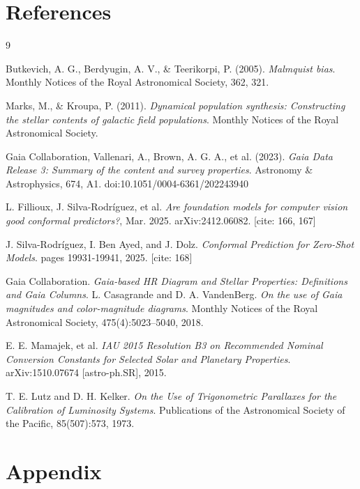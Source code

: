 \documentclass[11pt]{article}
\begin{document}
\section{References}
\begin{thebibliography}{9}

Butkevich, A. G., Berdyugin, A. V., \& Teerikorpi, P. (2005).
\textit{Malmquist bias}.
Monthly Notices of the Royal Astronomical Society, 362, 321.

Marks, M., \& Kroupa, P. (2011).
\textit{Dynamical population synthesis: Constructing the stellar contents of galactic field populations}.
Monthly Notices of the Royal Astronomical Society.

Gaia Collaboration, Vallenari, A., Brown, A. G. A., et al. (2023).
\textit{Gaia Data Release 3: Summary of the content and survey properties}.
Astronomy \& Astrophysics, 674, A1.
doi:10.1051/0004-6361/202243940

L. Fillioux, J. Silva-Rodríguez, et al. 
\textit{Are foundation models for computer vision good conformal predictors?}, 
Mar. 2025. arXiv:2412.06082. [cite: 166, 167]

J. Silva-Rodríguez, I. Ben Ayed, and J. Dolz. 
\textit{Conformal Prediction for Zero-Shot Models}. 
pages 19931-19941, 2025. [cite: 168]

Gaia Collaboration. 
\textit{Gaia-based HR Diagram and Stellar Properties: Definitions and Gaia Columns}. 
L. Casagrande and D. A. VandenBerg. 
\textit{On the use of Gaia magnitudes and color-magnitude diagrams}. 
Monthly Notices of the Royal Astronomical Society, 475(4):5023–5040, 2018.

E. E. Mamajek, et al. 
\textit{IAU 2015 Resolution B3 on Recommended Nominal Conversion Constants for Selected Solar and Planetary Properties}. 
arXiv:1510.07674 [astro-ph.SR], 2015.

T. E. Lutz and D. H. Kelker. 
\textit{On the Use of Trigonometric Parallaxes for the Calibration of Luminosity Systems}. 
Publications of the Astronomical Society of the Pacific, 85(507):573, 1973.
\end{thebibliography}

\section{Appendix}
\end{document}
